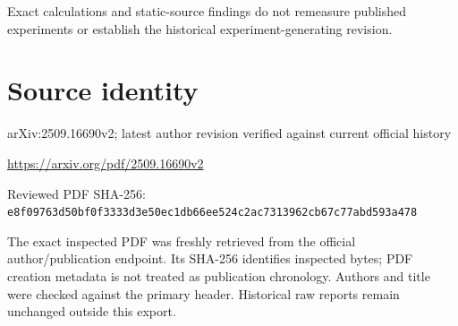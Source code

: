 \documentclass[11pt]{article}
\begin{document}
Exact calculations and static-source findings do not remeasure published experiments or establish the historical experiment-generating revision.\par

\section*{Source identity}

arXiv:2509.16690v2; latest author revision verified against current official history

\url{https://arxiv.org/pdf/2509.16690v2}

Reviewed PDF SHA-256: \nolinkurl{e8f09763d50bf0f3333d3e50ec1db66ee524c2ac7313962cb67c77abd593a478}

The exact inspected PDF was freshly retrieved from the official author/publication endpoint. Its SHA-256 identifies inspected bytes; PDF creation metadata is not treated as publication chronology. Authors and title were checked against the primary header. Historical raw reports remain unchanged outside this export.
\end{document}

